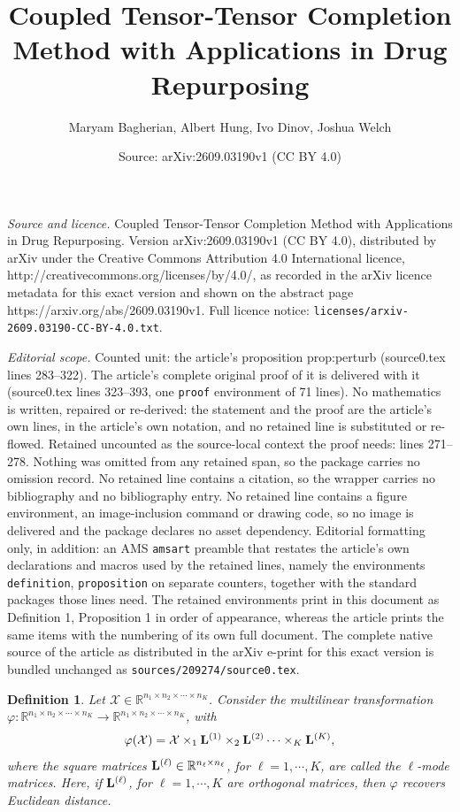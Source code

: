 \documentclass[10pt,a4paper]{amsart}
\title{Coupled Tensor-Tensor Completion Method with Applications in Drug Repurposing}
\author{Maryam Bagherian, Albert Hung, Ivo Dinov, Joshua Welch}
\date{Source: arXiv:2609.03190v1 (CC BY 4.0)}
\newtheorem{definition}{Definition}
\newcommand{\T}{\mathcal}
\newcommand{\m}[1]{{\bf{#1}}}
\begin{document}
\maketitle

\noindent\emph{Source and licence.} Coupled Tensor-Tensor Completion Method with Applications in Drug Repurposing. Version arXiv:2609.03190v1 (CC BY 4.0), distributed by arXiv under the Creative Commons Attribution 4.0 International licence, http://creativecommons.org/licenses/by/4.0/, as recorded in the arXiv licence metadata for this exact version and shown on the abstract page https://arxiv.org/abs/2609.03190v1. Full licence notice: \texttt{licenses/arxiv-2609.03190-CC-BY-4.0.txt}.\par\smallskip

\noindent\textit{Editorial scope.} Counted unit: the article's proposition prop:perturb (source0.tex lines 283--322). The article's complete original proof of it is delivered with it (source0.tex lines 323--393, one \texttt{proof} environment of 71 lines). No mathematics is written, repaired or re-derived: the statement and the proof are the article's own lines, in the article's own notation, and no retained line is substituted or re-flowed.  Retained uncounted as the source-local context the proof needs: lines 271--278.  Nothing was omitted from any retained span, so the package carries no omission record.  No retained line contains a citation, so the wrapper carries no bibliography and no bibliography entry.  No retained line contains a figure environment, an image-inclusion command or drawing code, so no image is delivered and the package declares no asset dependency.  Editorial formatting only, in addition: an AMS \texttt{amsart} preamble that restates the article's own declarations and macros used by the retained lines, namely the environments \texttt{definition}, \texttt{proposition} on separate counters, together with the standard packages those lines need.  The retained environments print in this document as Definition 1, Proposition 1 in order of appearance, whereas the article prints the same items with the numbering of its own full document.  The complete native source of the article as distributed in the arXiv e-print for this exact version is bundled unchanged as \texttt{sources/209274/source0.tex}.
\begin{definition}\label{def:maha}
Let $\T X\in \mathbb R^{n_1\times n_2\times \cdots\times n_K}$. Consider the multilinear transformation \\
$ \varphi:\mathbb R^{n_1\times n_2\times \cdots\times n_K}\to \mathbb R^{n_1\times n_2\times \cdots\times n_K}$, with
\begin{align}
\varphi(\T X)= \T X\times_1 \m L^{(1)}\times_2 \m L^{(2)}\cdots \times_K \m L^{(K)}, 
\end{align}
where the square matrices $\m L^{(\ell)}\in \mathbb R^{n_\ell\times n_\ell}$, for $\ell=1,\cdots, K$, are called the $\ell$-mode matrices. Here, if $\m L^{(\ell)}$, for $\ell=1, \cdots, K$ are orthogonal matrices, then $ \varphi$ recovers Euclidean distance.
\end{definition}
\end{document}
